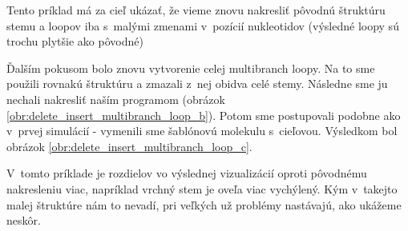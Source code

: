 Tento príklad má za cieľ ukázať, že vieme znovu nakresliť pôvodnú štruktúru
stemu a loopov iba s~malými zmenami v~pozícií
nukleotidov (výsledné loopy sú trochu plytšie ako pôvodné)

Ďalším pokusom bolo znovu vytvorenie celej multibranch loopy.
Na to sme použili rovnakú štruktúru a zmazali z~nej obidva celé
stemy. Následne sme ju nechali nakresliť naším programom
(obrázok \ref{obr:delete_insert_multibranch_loop_b}).
Potom sme postupovali podobne ako v~prvej simulácií - vymenili
sme šablónovú molekulu s~cieľovou. Výsledkom bol obrázok
\ref{obr:delete_insert_multibranch_loop_c}.

V~tomto príklade je rozdielov vo výslednej vizualizácií oproti pôvodnému nakresleniu
viac, napríklad vrchný stem je oveľa viac vychýlený. Kým v~takejto malej štruktúre
nám to nevadí, pri veľkých už problémy nastávajú, ako ukážeme neskôr.

